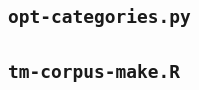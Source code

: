 \subsection{\texttt{opt-categories.py}}
\label{sec:opt-categories.py}


\subsection{\texttt{tm-corpus-make.R}}
\label{sec:tm-corpus-make.R}


% 
% 
% 
% 
% 
% 
% 

% 
